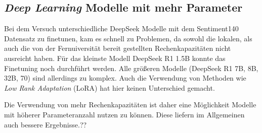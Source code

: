 \subsection{\textit{Deep Learning} Modelle mit mehr Parameter}
Bei dem Versuch unterschiedliche DeepSeek Modelle mit dem Sentiment140 Datensatz zu finetunen, kam es schnell zu Problemen, da sowohl die lokalen, als auch die von der Fernuiversität bereit gestellten Rechenkapazitäten nicht ausreicht haben. 
Für das kleinste Modell DeepSeek R1 1.5B konnte das Finetuning noch durchführt werden. Alle größeren Modelle (DeepSeek R1 7B, 8B, 32B, 70) sind allerdings zu komplex. 
Auch die Verwendung von Methoden wie \textit{Low Rank Adaptation} (LoRA) hat hier keinen Unterschied gemacht.

Die Verwendung von mehr Rechenkapazitäten ist daher eine Möglichkeit Modelle mit höherer Parameteranzahl nutzen zu können. Diese liefern im Allgemeinen auch bessere Ergebnisse.??